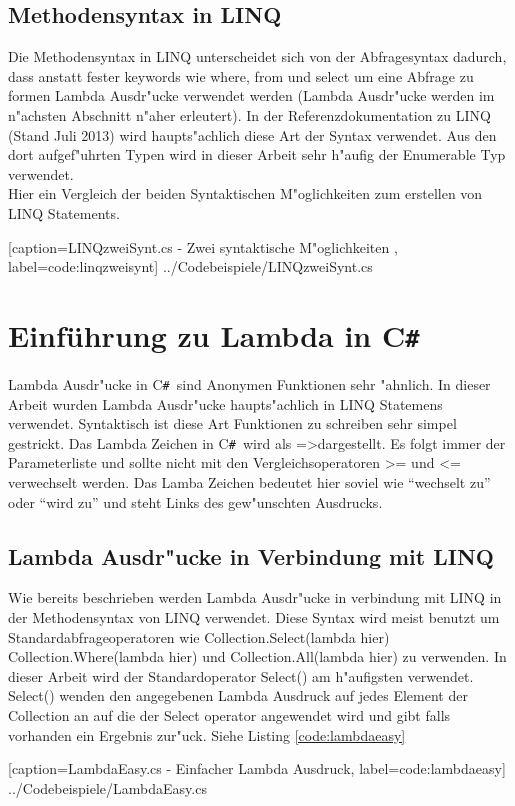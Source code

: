 \documentclass[pagesize, paper=a4, fontsize=12pt,titlepage=true, headings=small, headnosepline, abstractoff, liststotoc, nochapterprefix, plainheadsepline]{scrreprt}
\newcommand{\CS}{C\texttt{\#}}
\newcommand{\CSS}{C\texttt{\# }}
\newcommand{\LAM}{ =\textgreater\space}
\begin{document}
		\subsection {Methodensyntax in LINQ}
		Die Methodensyntax in LINQ unterscheidet sich von der Abfragesyntax dadurch, dass anstatt fester keywords wie where, from und select um eine Abfrage zu formen Lambda Ausdr"ucke verwendet werden (Lambda Ausdr"ucke werden im n"achsten Abschnitt n"aher erleutert). In der Referenzdokumentation zu LINQ (Stand Juli 2013) \cite{MicrosoftCReferenz.2013} wird haupts"achlich diese Art der Syntax verwendet. Aus den dort aufgef"uhrten Typen wird in dieser Arbeit sehr h"aufig der Enumerable Typ verwendet.
\\
Hier ein Vergleich der beiden Syntaktischen M"oglichkeiten zum erstellen von LINQ Statements.

			[caption={LINQzweiSynt.cs - Zwei syntaktische M"oglichkeiten} \protect\cite{MicrosoftCReferenz.2013}, label=code:linqzweisynt]
			{../Codebeispiele/LINQzweiSynt.cs}
	\section {Einführung zu Lambda in \CS}
		Lambda Ausdr"ucke in \CSS sind Anonymen Funktionen sehr "ahnlich. In dieser Arbeit wurden Lambda Ausdr"ucke haupts"achlich in LINQ Statemens verwendet. Syntaktisch ist diese Art Funktionen zu schreiben sehr simpel gestrickt. Das Lambda Zeichen in \CSS wird als \LAM dargestellt. Es folgt immer der Parameterliste und sollte nicht mit den Vergleichsoperatoren \textgreater = und \textless = verwechselt werden. Das Lamba Zeichen bedeutet hier soviel wie "`wechselt zu"' oder "`wird zu"' und steht Links des gew"unschten Ausdrucks.
		\subsection {Lambda Ausdr"ucke in Verbindung mit LINQ}
Wie bereits beschrieben werden Lambda Ausdr"ucke  in verbindung mit LINQ in der Methodensyntax von LINQ verwendet. Diese Syntax wird meist benutzt um Standardabfrageoperatoren wie Collection.Select(lambda hier) Collection.Where(lambda hier) und Collection.All(lambda hier) zu verwenden. In dieser Arbeit wird der Standardoperator Select() am h"aufigsten verwendet. Select() wenden den angegebenen Lambda Ausdruck auf jedes Element der Collection an auf die der Select operator angewendet wird und gibt falls vorhanden ein Ergebnis zur"uck. Siehe Listing \ref{code:lambdaeasy}

			[caption={LambdaEasy.cs - Einfacher Lambda Ausdruck}, label=code:lambdaeasy]
			{../Codebeispiele/LambdaEasy.cs}
\end{document}
